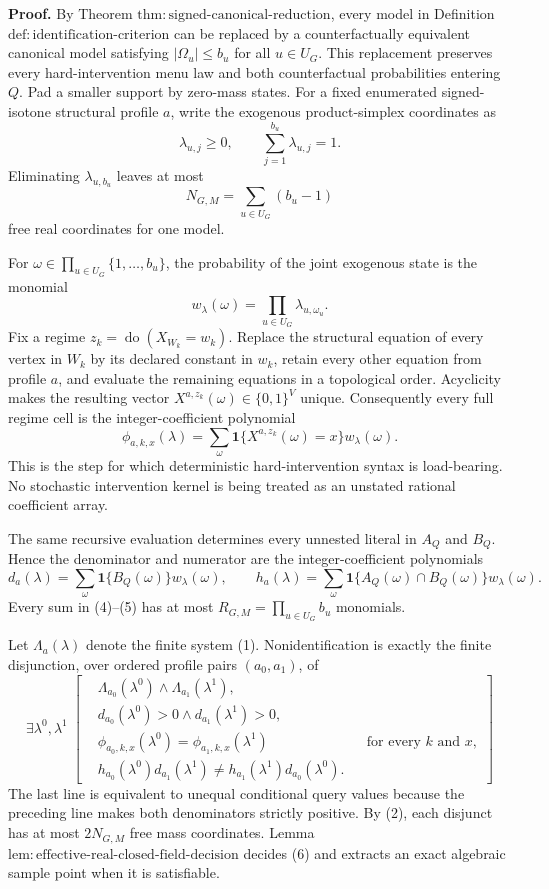 \textbf{Proof.}
By Theorem \(\mathrm{thm:signed\text{-}canonical\text{-}reduction}\), every model in Definition \(\mathrm{def:identification\text{-}criterion}\) can be replaced by a counterfactually equivalent canonical model satisfying \(|\Omega_u|\le b_u\) for all \(u\in U_G\).  This replacement preserves every hard-intervention menu law and both counterfactual probabilities entering \(Q\).  Pad a smaller support by zero-mass states.  For a fixed enumerated signed-isotone structural profile \(a\), write the exogenous product-simplex coordinates as
\[
 \lambda_{u,j}\ge0,
 \qquad
 \sum_{j=1}^{b_u}\lambda_{u,j}=1.
\tag{1}
\]
Eliminating \(\lambda_{u,b_u}\) leaves at most
\[
 N_{G,M}=\sum_{u\in U_G}(b_u-1)
\tag{2}
\]
free real coordinates for one model.

For \(\omega\in\prod_{u\in U_G}\{1,\ldots,b_u\}\), the probability of the joint exogenous state is the monomial
\[
 w_\lambda(\omega)=\prod_{u\in U_G}\lambda_{u,\omega_u}.
\tag{3}
\]
Fix a regime \(z_k=\operatorname{do}(X_{W_k}=w_k)\).  Replace the structural equation of every vertex in \(W_k\) by its declared constant in \(w_k\), retain every other equation from profile \(a\), and evaluate the remaining equations in a topological order.  Acyclicity makes the resulting vector \(X^{a,z_k}(\omega)\in\{0,1\}^{V}\) unique.  Consequently every full regime cell is the integer-coefficient polynomial
\[
 \phi_{a,k,x}(\lambda)
 =\sum_{\omega}
   \mathbf 1\{X^{a,z_k}(\omega)=x\}
   w_\lambda(\omega).
\tag{4}
\]
This is the step for which deterministic hard-intervention syntax is load-bearing.  No stochastic intervention kernel is being treated as an unstated rational coefficient array.

The same recursive evaluation determines every unnested literal in \(A_Q\) and \(B_Q\).  Hence the denominator and numerator are the integer-coefficient polynomials
\[
 d_a(\lambda)
 =\sum_{\omega}\mathbf 1\{B_Q(\omega)\}w_\lambda(\omega),
 \qquad
 h_a(\lambda)
 =\sum_{\omega}\mathbf 1\{A_Q(\omega)\cap B_Q(\omega)\}w_\lambda(\omega).
\tag{5}
\]
Every sum in (4)--(5) has at most
\(
 R_{G,M}=\prod_{u\in U_G}b_u
\)
monomials.

Let \(\Lambda_a(\lambda)\) denote the finite system (1).  Nonidentification is exactly the finite disjunction, over ordered profile pairs \((a_0,a_1)\), of
\[
 \exists\lambda^0,\lambda^1\;\left[
 \begin{aligned}
 &\Lambda_{a_0}(\lambda^0)\wedge\Lambda_{a_1}(\lambda^1),\\
 &d_{a_0}(\lambda^0)>0\wedge d_{a_1}(\lambda^1)>0,\\
 &\phi_{a_0,k,x}(\lambda^0)=\phi_{a_1,k,x}(\lambda^1)
       &&\text{for every \(k\) and \(x\)},\\
 &h_{a_0}(\lambda^0)d_{a_1}(\lambda^1)
   \ne h_{a_1}(\lambda^1)d_{a_0}(\lambda^0).
 \end{aligned}\right]
\tag{6}
\]
The last line is equivalent to unequal conditional query values because the preceding line makes both denominators strictly positive.  By (2), each disjunct has at most \(2N_{G,M}\) free mass coordinates.  Lemma \(\mathrm{lem:effective\text{-}real\text{-}closed\text{-}field\text{-}decision}\) decides (6) and extracts an exact algebraic sample point when it is satisfiable.

